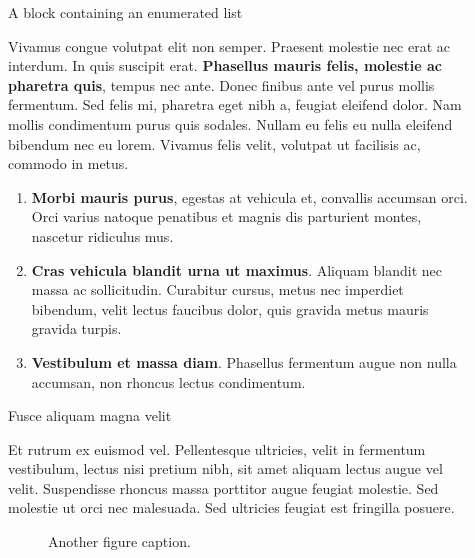 \documentclass[final]{beamer}
\newlength{\sepwidth}
\newlength{\colwidth}
\newcommand{\separatorcolumn}{\begin{column}{\sepwidth}\end{column}}
\begin{document}
\begin{frame}[t]
\begin{columns}[t]
\begin{column}{\colwidth}
\end{column}

\separatorcolumn

\begin{column}{\colwidth}

  \begin{block}{A block containing an enumerated list}

    Vivamus congue volutpat elit non semper. Praesent molestie nec erat ac
    interdum. In quis suscipit erat. \textbf{Phasellus mauris felis, molestie
    ac pharetra quis}, tempus nec ante. Donec finibus ante vel purus mollis
    fermentum. Sed felis mi, pharetra eget nibh a, feugiat eleifend dolor. Nam
    mollis condimentum purus quis sodales. Nullam eu felis eu nulla eleifend
    bibendum nec eu lorem. Vivamus felis velit, volutpat ut facilisis ac,
    commodo in metus.

    \begin{enumerate}
      \item \textbf{Morbi mauris purus}, egestas at vehicula et, convallis
        accumsan orci. Orci varius natoque penatibus et magnis dis parturient
        montes, nascetur ridiculus mus.
      \item \textbf{Cras vehicula blandit urna ut maximus}. Aliquam blandit nec
        massa ac sollicitudin. Curabitur cursus, metus nec imperdiet bibendum,
        velit lectus faucibus dolor, quis gravida metus mauris gravida turpis.
      \item \textbf{Vestibulum et massa diam}. Phasellus fermentum augue non
        nulla accumsan, non rhoncus lectus condimentum.
    \end{enumerate}

  \end{block}

  \begin{block}{Fusce aliquam magna velit}

    Et rutrum ex euismod vel. Pellentesque ultricies, velit in fermentum
    vestibulum, lectus nisi pretium nibh, sit amet aliquam lectus augue vel
    velit. Suspendisse rhoncus massa porttitor augue feugiat molestie. Sed
    molestie ut orci nec malesuada. Sed ultricies feugiat est fringilla
    posuere.

    \begin{figure}
      \centering
      \caption{Another figure caption.}
    \end{figure}


\end{block}
\end{column}
\end{columns}
\end{frame}
\end{document}
